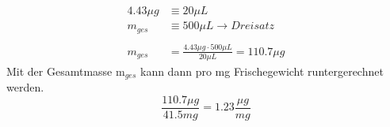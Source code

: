 \documentclass[10pt,a4paper]{article}
\begin{document}
	\begin{equation}\nonumber
		\begin{split}
			4.43 \mu g &\equiv 20 \mu L\\
			m_{ges} &\equiv 500 \mu L \rightarrow Dreisatz\\
		\\
			m_{ges} & = \frac{4.43 \mu g  \cdot 500 \mu L}{20 \mu L} = 110.7 \mu g
		\end{split}
	\end{equation}
	Mit der Gesamtmasse m$_{ges}$ kann dann pro mg Frischegewicht runtergerechnet werden.\\
	\begin{equation}\nonumber
		\frac{110.7 \mu g}{41.5 mg} = 1.23 \frac{\mu g}{mg}
	\end{equation}

	
	


	
	\nocite{*}
	
	\newpage

	
\end{document}
